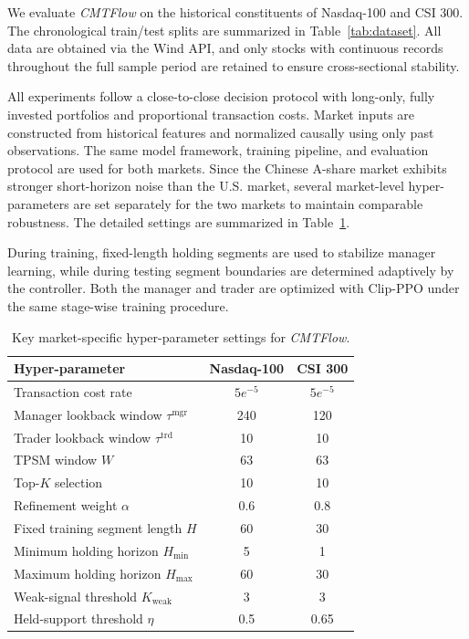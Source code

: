 \documentclass[letterpaper]{article} %
\begin{document}
We evaluate \textit{CMTFlow} on the historical constituents of Nasdaq-100 and CSI 300. The chronological train/test splits are summarized in Table~\ref{tab:dataset}. All data are obtained via the Wind API, and only stocks with continuous records throughout the full sample period are retained to ensure cross-sectional stability.

All experiments follow a close-to-close decision protocol with long-only, fully invested portfolios and proportional transaction costs. Market inputs are constructed from historical features and normalized causally using only past observations. The same model framework, training pipeline, and evaluation protocol are used for both markets. Since the Chinese A-share market exhibits stronger short-horizon noise than the U.S. market, several market-level hyper-parameters are set separately for the two markets to maintain comparable robustness. The detailed settings are summarized in Table~\ref{tab:hyperparam}.

During training, fixed-length holding segments are used to stabilize manager learning, while during testing segment boundaries are determined adaptively by the controller. Both the manager and trader are optimized with Clip-PPO under the same stage-wise training procedure.

\begin{table}[t]
\centering
\caption{Key market-specific hyper-parameter settings for \textit{CMTFlow}.}
\label{tab:hyperparam}
\small
\setlength{\tabcolsep}{6pt}
\begin{tabular}{lcc}
\hline
\textbf{Hyper-parameter} & \textbf{Nasdaq-100} & \textbf{CSI 300} \\
\hline
Transaction cost rate & $5e^{-5}$ & $5e^{-5}$ \\
Manager lookback window \(\tau^{\mathrm{mgr}}\) & 240 & 120 \\
Trader lookback window \(\tau^{\mathrm{trd}}\) & 10 & 10 \\
TPSM window \(W\) & 63 & 63 \\
Top-\(K\) selection & 10 & 10 \\
Refinement weight \(\alpha\) & 0.6 & 0.8 \\
Fixed training segment length \(H\) & 60 & 30 \\
Minimum holding horizon \(H_{\min}\) & 5 & 1 \\
Maximum holding horizon \(H_{\max}\) & 60 & 30 \\
Weak-signal threshold \(K_{\mathrm{weak}}\) & 3 & 3 \\
Held-support threshold \(\eta\) & 0.5 & 0.65 \\
\hline
\end{tabular}
\end{table}
\end{document}
